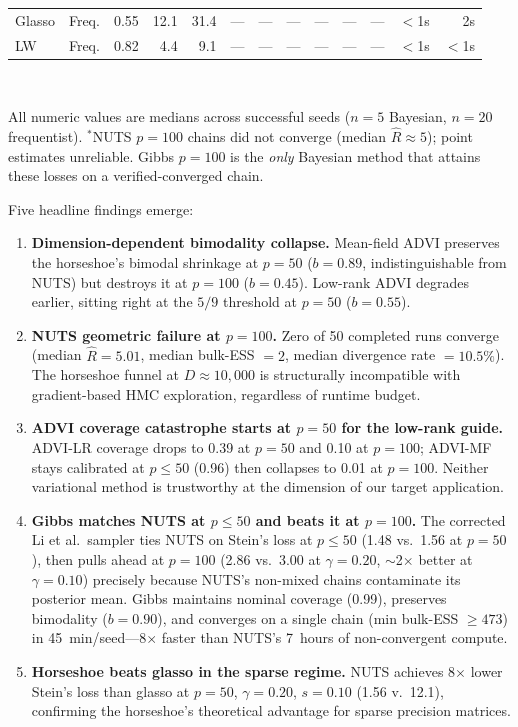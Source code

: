 \documentclass[10pt,conference,compsoc]{IEEEtran}
\begin{document}
\begin{table}[t]
\begin{tabular}{@{}ll rrr rrr rrr rr@{}}
Glasso    & Freq.       & 0.55 & 12.1 & 31.4   & --- & --- & --- & --- & --- & --- & $<$1s & 2s \\
LW        & Freq.       & 0.82 & 4.4  & 9.1    & --- & --- & --- & --- & --- & --- & $<$1s & $<$1s \\
\bottomrule
\end{tabular}\\[2pt]
\raggedright\footnotesize All numeric values are medians across successful seeds ($n{=}5$ Bayesian, $n{=}20$ frequentist). $^*$NUTS $p{=}100$ chains did not converge (median $\hat{R}\approx 5$); point estimates unreliable. Gibbs $p{=}100$ is the \emph{only} Bayesian method that attains these losses on a verified-converged chain.
\end{table}

Five headline findings emerge:

\begin{enumerate}[leftmargin=*]
  \item \textbf{Dimension-dependent bimodality collapse.} Mean-field ADVI preserves the horseshoe's bimodal shrinkage at $p{=}50$ ($b = 0.89$, indistinguishable from NUTS) but destroys it at $p{=}100$ ($b = 0.45$). Low-rank ADVI degrades earlier, sitting right at the $5/9$ threshold at $p{=}50$ ($b = 0.55$).

  \item \textbf{NUTS geometric failure at $p{=}100$.} Zero of 50 completed runs converge (median $\hat{R} = 5.01$, median bulk-ESS $= 2$, median divergence rate $= 10.5\%$). The horseshoe funnel at $D \approx 10{,}000$ is structurally incompatible with gradient-based HMC exploration, regardless of runtime budget.

  \item \textbf{ADVI coverage catastrophe starts at $p{=}50$ for the low-rank guide.} ADVI-LR coverage drops to 0.39 at $p{=}50$ and 0.10 at $p{=}100$; ADVI-MF stays calibrated at $p{\leq}50$ (0.96) then collapses to 0.01 at $p{=}100$. Neither variational method is trustworthy at the dimension of our target application.

  \item \textbf{Gibbs matches NUTS at $p{\leq}50$ and beats it at $p{=}100$.} The corrected Li et al.\ sampler ties NUTS on Stein's loss at $p{\leq}50$ (1.48 vs.\ 1.56 at $p{=}50$), then pulls ahead at $p{=}100$ (2.86 vs.\ 3.00 at $\gamma{=}0.20$, ${\sim}$2$\times$ better at $\gamma{=}0.10$) precisely because NUTS's non-mixed chains contaminate its posterior mean. Gibbs maintains nominal coverage (0.99), preserves bimodality ($b = 0.90$), and converges on a single chain (min bulk-ESS $\geq 473$) in 45~min/seed---8$\times$ faster than NUTS's 7~hours of non-convergent compute.

  \item \textbf{Horseshoe beats glasso in the sparse regime.} NUTS achieves 8$\times$ lower Stein's loss than glasso at $p{=}50$, $\gamma{=}0.20$, $s{=}0.10$ (1.56 v.\ 12.1), confirming the horseshoe's theoretical advantage for sparse precision matrices.
\end{enumerate}
\end{document}
